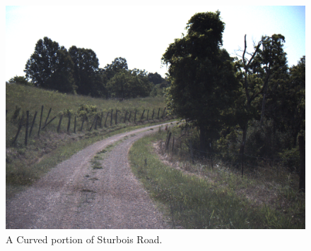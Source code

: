 \documentclass[numbered,pdftex]{ohio-etd}
\begin{document}
{		\begin{figure}[H]
			\centering
			\includegraphics[width=1.0\linewidth]{Defense_Images/sturbois_1_Curve_camera}
			\caption[Sturbois Road Curve]{A Curved portion of Sturbois Road.}
			\label{fig:sturbois_1_Curve_camera}
		\end{figure}
		
}
\end{document}
